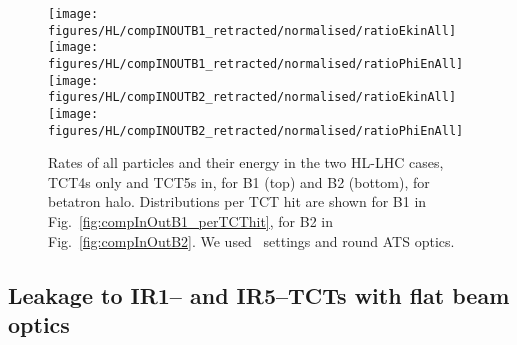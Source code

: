 \begin{figure}
\centering
\texttt{[image: figures/HL/compINOUTB1\_retracted/normalised/ratioEkinAll]}
\texttt{[image: figures/HL/compINOUTB1\_retracted/normalised/ratioPhiEnAll]}
\texttt{[image: figures/HL/compINOUTB2\_retracted/normalised/ratioEkinAll]}
\texttt{[image: figures/HL/compINOUTB2\_retracted/normalised/ratioPhiEnAll]}
\caption{Rates of all particles and their energy in the two HL-LHC cases, TCT4s only and TCT5s in, for B1 (top) and B2 (bottom), for betatron halo. Distributions per TCT hit are shown for B1 in Fig.~\ref{fig:compInOutB1_perTCThit}, for B2 in Fig.~\ref{fig:compInOutB2}. We used \twosigmaret~settings and round ATS optics.
  \label{fig:compInOut}}
\end{figure}





\subsection{Leakage to IR1-- and IR5--TCTs with flat beam optics}

